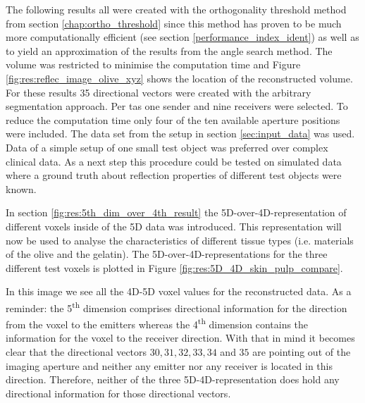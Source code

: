 The following results all were created with the orthogonality threshold method from section \ref{chap:ortho_threshold} since this method has proven to be much more computationally efficient (see section \ref{performance_index_ident}) as well as to yield an approximation of the results from the angle search method. The volume was restricted to minimise the computation time and Figure \ref{fig:res:reflec_image_olive_xyz} shows the location of the reconstructed volume. For these results 35 directional vectors were created with the arbitrary segmentation approach. Per \ac{tas} one sender and nine receivers were selected. To reduce the computation time only four of the ten available aperture positions were included. The data set from the setup in section \ref{sec:input_data} was used. Data of a simple setup of one small test object was preferred over complex clinical data. As a next step this procedure could be tested on simulated data where a ground truth about reflection properties of different test objects were known. 



In section \ref{fig:res:5th_dim_over_4th_result} the 5D-over-4D-representation of different voxels inside of the 5D data was introduced. This representation will now be used to analyse the characteristics of different tissue types (i.e. materials of the olive and the gelatin). The 5D-over-4D-representations for the three different test voxels is plotted in Figure \ref{fig:res:5D_4D_skin_pulp_compare}. 

In this image we see all the 4D-5D voxel values for the reconstructed data. As a reminder: the 5\textsuperscript{th} dimension comprises directional information for the direction from the voxel to the emitters whereas the 4\textsuperscript{th} dimension contains the information for the voxel to the receiver direction. With that in mind it becomes clear that the directional vectors $30, 31, 32, 33, 34$ and $35$ are pointing out of the imaging aperture and neither any emitter nor any receiver is located in this direction. Therefore, neither of the three 5D-4D-representation does hold any directional information for those directional vectors.

